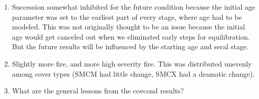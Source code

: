 \documentclass[12pt]{article}
\begin{document}
\begin{spacing}{1}
\begin{enumerate}
	\item Succession somewhat inhibited for the future condition because the initial age parameter was set to the earliest part of every stage, where age had to be modeled. This was not originally thought to be an issue because the initial age would get canceled out when we eliminated early steps for equilibration. But the future results will be influenced by the starting age and seral stage.
	\item Slightly more fire, and more high severity fire. This was distributed unevenly among cover types (SMCM had little change, SMCX had a dramatic change).
	\item What are the general lessons from the covcond results?

\end{enumerate}


\end{spacing}
\end{document}
